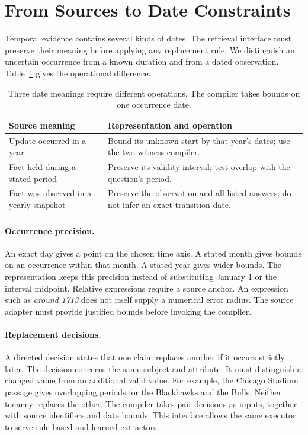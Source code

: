 \section{From Sources to Date Constraints}
\label{sec:sources}

Temporal evidence contains several kinds of dates.
The retrieval interface must preserve their meaning before applying any replacement rule.
We distinguish an uncertain occurrence from a known duration and from a dated observation.
Table~\ref{tab:date-types} gives the operational difference.

\begin{table}[t]
\centering\small
\begin{tabular}{@{}p{}p{}@{}}
\toprule
Source meaning & Representation and operation\\
\midrule
Update occurred in a year & Bound its unknown start by that year's dates; use the two-witness compiler.\\[3pt]
Fact held during a stated period & Preserve its validity interval; test overlap with the question's period.\\[3pt]
Fact was observed in a yearly snapshot & Preserve the observation and all listed answers; do not infer an exact transition date.\\
\bottomrule
\end{tabular}
\caption{Three date meanings require different operations. The compiler takes bounds on one occurrence date.}
\label{tab:date-types}
\end{table}

\paragraph{Occurrence precision.}
An exact day gives a point on the chosen time axis.
A stated month gives bounds on an occurrence within that month.
A stated year gives wider bounds.
The representation keeps this precision instead of substituting January 1 or the interval midpoint.
Relative expressions require a source anchor.
An expression such as \emph{around 1713} does not itself supply a numerical error radius.
The source adapter must provide justified bounds before invoking the compiler.

\paragraph{Replacement decisions.}
A directed decision states that one claim replaces another if it occurs strictly later.
The decision concerns the same subject and attribute.
It must distinguish a changed value from an additional valid value.
For example, the Chicago Stadium passage gives overlapping periods for the Blackhawks and the Bulls.
Neither tenancy replaces the other.
The compiler takes pair decisions as inputs, together with source identifiers and date bounds.
This interface allows the same executor to serve rule-based and learned extractors.

